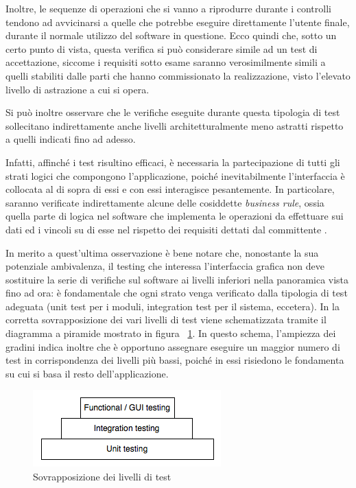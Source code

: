 Inoltre, le sequenze di operazioni che si vanno a riprodurre durante i controlli tendono ad avvicinarsi a quelle che potrebbe eseguire direttamente l'utente finale, durante il normale utilizzo del software in questione. Ecco quindi che, sotto un certo punto di vista, questa verifica si può considerare simile ad un test di accettazione, siccome i requisiti sotto esame saranno verosimilmente simili a quelli stabiliti dalle parti che hanno commissionato la realizzazione, visto l'elevato livello di astrazione a cui si opera.

Si può inoltre osservare che le verifiche eseguite durante questa tipologia di test sollecitano indirettamente anche livelli architetturalmente meno astratti rispetto a quelli indicati fino ad adesso. 

Infatti, affinché i test risultino efficaci, è necessaria la partecipazione di tutti gli strati logici che compongono l'applicazione, poiché inevitabilmente l'interfaccia è collocata al di sopra di essi e con essi interagisce pesantemente. In particolare, saranno verificate indirettamente alcune delle cosiddette \emph{business rule}, ossia quella parte di logica nel software che implementa le operazioni da effettuare sui dati ed i vincoli su di esse nel rispetto dei requisiti dettati dal committente \cite{agileRequirements}.

In merito a quest'ultima osservazione  è bene notare che, nonostante la sua potenziale ambivalenza, il testing che interessa l'interfaccia grafica non deve sostituire la serie di verifiche sul software ai livelli inferiori nella panoramica vista fino ad ora: è fondamentale che ogni strato venga verificato dalla tipologia di test adeguata (unit test per i moduli, integration test per il sistema, eccetera). In \cite{microsoft} la corretta sovrapposizione dei vari livelli di test viene schematizzata tramite il diagramma a piramide mostrato in figura ~\ref{fig:testPyramid}. In questo schema, l'ampiezza dei gradini indica inoltre che è opportuno assegnare eseguire un maggior numero di test in corrispondenza dei livelli più bassi, poiché in essi risiedono le fondamenta su cui si basa il resto dell'applicazione.

\begin{figure}[htbp]
\begin{center}
\includegraphics{images/test_pyramid.png}
\caption{Sovrapposizione dei livelli di test}
\label{fig:testPyramid}
\end{center}
\end{figure}

